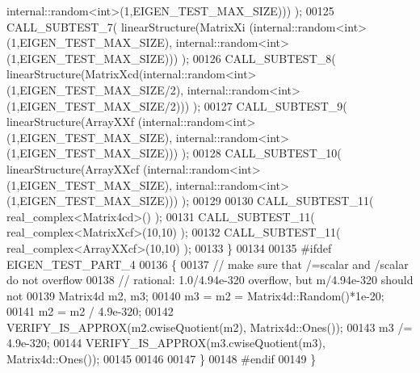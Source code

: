 \begin{DoxyCode}
      internal::random<int>(1,EIGEN\_TEST\_MAX\_SIZE))) );
00125     CALL\_SUBTEST\_7( linearStructure(MatrixXi (internal::random<int>(1,EIGEN\_TEST\_MAX\_SIZE), 
      internal::random<int>(1,EIGEN\_TEST\_MAX\_SIZE))) );
00126     CALL\_SUBTEST\_8( linearStructure(MatrixXcd(internal::random<int>(1,EIGEN\_TEST\_MAX\_SIZE/2), 
      internal::random<int>(1,EIGEN\_TEST\_MAX\_SIZE/2))) );
00127     CALL\_SUBTEST\_9( linearStructure(ArrayXXf (internal::random<int>(1,EIGEN\_TEST\_MAX\_SIZE), 
      internal::random<int>(1,EIGEN\_TEST\_MAX\_SIZE))) );
00128     CALL\_SUBTEST\_10( linearStructure(ArrayXXcf (internal::random<int>(1,EIGEN\_TEST\_MAX\_SIZE), 
      internal::random<int>(1,EIGEN\_TEST\_MAX\_SIZE))) );
00129     
00130     CALL\_SUBTEST\_11( real\_complex<Matrix4cd>() );
00131     CALL\_SUBTEST\_11( real\_complex<MatrixXcf>(10,10) );
00132     CALL\_SUBTEST\_11( real\_complex<ArrayXXcf>(10,10) );
00133   \}
00134   
00135 \textcolor{preprocessor}{#ifdef EIGEN\_TEST\_PART\_4}
00136   \{
00137     \textcolor{comment}{// make sure that /=scalar and /scalar do not overflow}
00138     \textcolor{comment}{// rational: 1.0/4.94e-320 overflow, but m/4.94e-320 should not}
00139     Matrix4d m2, m3;
00140     m3 = m2 =  Matrix4d::Random()*1e-20;
00141     m2 = m2 / 4.9e-320;
00142     VERIFY\_IS\_APPROX(m2.cwiseQuotient(m2), Matrix4d::Ones());
00143     m3 /= 4.9e-320;
00144     VERIFY\_IS\_APPROX(m3.cwiseQuotient(m3), Matrix4d::Ones());
00145     
00146     
00147   \}
00148 \textcolor{preprocessor}{#endif}
00149 \}
\end{DoxyCode}
